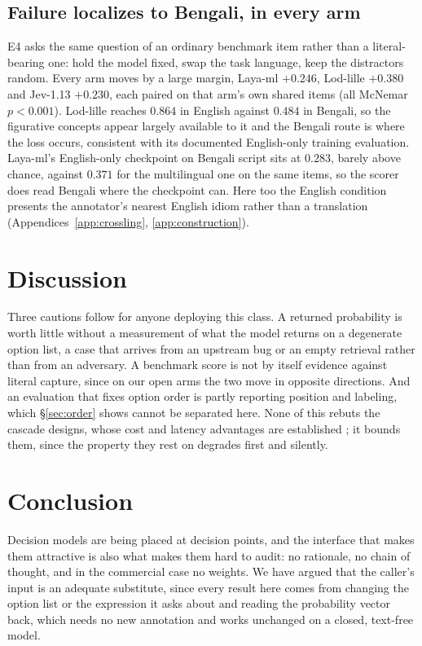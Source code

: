 \documentclass[11pt]{article}
\begin{document}
\subsection{Failure localizes to Bengali, in every arm}
\label{sec:crosslingual}

E4 asks the same question of an ordinary benchmark item rather than a
literal-bearing one: hold the model fixed, swap the task language, keep the
distractors random. Every arm moves by a large margin, Laya-ml $+0.246$,
Lod-lille $+0.380$ and Jev-1.13 $+0.230$, each paired on that arm's own shared
items (all McNemar $p<0.001$). Lod-lille reaches $0.864$ in English against
$0.484$ in Bengali, so the figurative concepts appear largely available to it and
the Bengali route is where the loss occurs, consistent with its documented
English-only training evaluation. Laya-ml's English-only checkpoint on Bengali
script sits at $0.283$, barely above chance, against $0.371$ for the multilingual
one on the same items, so the scorer does read Bengali where the checkpoint can. Here too the
English condition presents the annotator's nearest English idiom rather than a
translation (Appendices~\ref{app:crossling}, \ref{app:construction}).

\section{Discussion}

Three cautions follow for anyone deploying this class. A returned probability is
worth little without a measurement of what the model returns on a degenerate
option list, a case that arrives from an upstream bug or an empty retrieval rather
than from an adversary. A benchmark score is not by itself evidence against
literal capture, since on our open arms the two move in opposite directions. And
an evaluation that fixes option order is partly reporting position and labeling,
which \S\ref{sec:order} shows cannot be separated here. None of this rebuts the
cascade designs, whose cost and latency advantages are established
\citep{tang2026audit,rao2026rubric}; it bounds them, since the property they rest
on degrades first and silently.

\section{Conclusion}

Decision models are being placed at decision points, and the interface that makes
them attractive is also what makes them hard to audit: no rationale, no chain of
thought, and in the commercial case no weights. We have argued that the caller's
input is an adequate substitute, since every result here comes from changing the
option list or the expression it asks about and reading the probability vector
back, which needs no new annotation and works unchanged on a closed, text-free
model.
\end{document}
